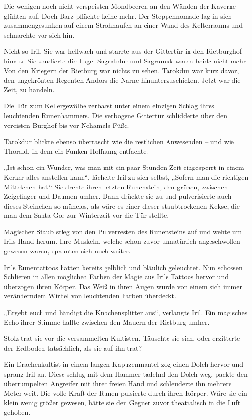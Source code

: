 Die wenigen noch nicht verspeisten Mondbeeren an den Wänden der Kaverne glühten auf. Doch Barz pflückte keine mehr. Der Steppennomade lag in sich zusammengesunken auf einem Strohhaufen an einer Wand des Kelterraums und schnarchte vor sich hin.

Nicht so Iril. Sie war hellwach und starrte aus der Gittertür in den Rietburghof hinaus. Sie sondierte die Lage. Sagrakdur und Sagramak waren beide nicht mehr. Von den Kriegern der Rietburg war nichts zu sehen. Tarokdur war kurz davor, den ungekrönten Regenten Andors die Narne hinunterzuschicken. Jetzt war die Zeit, zu handeln.

Die Tür zum Kellergewölbe zerbarst unter einem einzigen Schlag ihres leuchtenden Runenhammers. Die verbogene Gittertür schlidderte über den vereisten Burghof bis vor Nehamals Füße.

Tarokdur blickte ebenso überrascht wie die restlichen Anwesenden – und wie Thorald, in dem ein Funken Hoffnung entfachte.

„Ist schon ein Wunder, was man mit ein paar Stunden Zeit eingesperrt in einem Kerker alles anstellen kann“, lächelte Iril zu sich selbst, „Sofern man die richtigen Mittelchen hat.“ Sie drehte ihren letzten Runenstein, den grünen, zwischen Zeigefinger und Daumen umher. Dann drückte sie zu und pulverisierte auch dieses Steinchen so mühelos, als wäre es einer dieser staubtrockenen Kekse, die man dem Santa Gor zur Winterzeit vor die Tür stellte.

Magischer Staub stieg von den Pulverresten des Runensteins auf und wehte um Irils Hand herum. Ihre Muskeln, welche schon zuvor unnatürlich angeschwollen gewesen waren, spannten sich noch weiter.

Irils Runentattoos hatten bereits gelblich und bläulich geleuchtet. Nun schossen Schlieren in allen möglichen Farben der Magie aus Irils Tattoos hervor und überzogen ihren Körper. Das Weiß in ihren Augen wurde von einem sich immer veränderndem Wirbel von leuchtenden Farben überdeckt.

„Ergebt euch und händigt die Knochensplitter aus“, verlangte Iril. Ein magisches Echo ihrer Stimme hallte zwischen den Mauern der Rietburg umher.

Stolz trat sie vor die versammelten Kultisten. Täuschte sie sich, oder erzitterte der Erdboden tatsächlich, als sie auf ihn trat?

Ein Drachenkultist in einem langen Kapuzenmantel zog einen Dolch hervor und sprang Iril an. Diese schlug mit dem Hammer tadelnd den Dolch weg, packte den überrumpelten Angreifer mit ihrer freien Hand und schleuderte ihn mehrere Meter weit. Die volle Kraft der Runen pulsierte durch ihren Körper. Wäre sie ein klein wenig größer gewesen, hätte sie den Gegner zuvor theatralisch in die Luft gehoben.

